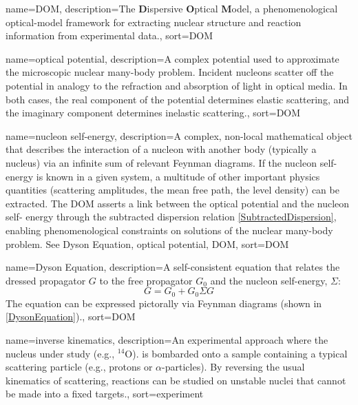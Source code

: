 \makeglossaries

{
    name={DOM},
    description={The \textbf{D}ispersive \textbf{O}ptical \textbf{M}odel, a phenomenological optical-model framework for extracting nuclear structure and reaction information from experimental data.},
    sort={DOM}
}

{
    name={optical potential},
    description={A complex potential used to approximate the microscopic nuclear many-body problem. Incident nucleons scatter off the potential in analogy to the refraction and absorption of light in optical media.  In both cases, the real component of the potential determines elastic scattering, and the imaginary component determines inelastic scattering.},
    sort={DOM}
}

{
    name={nucleon self-energy},
    description={A complex, non-local mathematical object that describes the interaction of a
        nucleon with another body (typically a nucleus) via an infinite sum of relevant Feynman 
        diagrams. If the nucleon self-energy is known in a given system, a multitude of other 
        important physics quantities (scattering amplitudes, the mean free path, the level density) 
        can be extracted. The DOM asserts a link between the optical potential and the nucleon self-
        energy through the subtracted dispersion relation \ref{SubtractedDispersion}, enabling 
        phenomenological constraints on solutions of the nuclear many-body 
        problem. See \Gls{Dyson Equation}, \Gls{optical potential}, \Gls{DOM}},
    sort={DOM}
}

{
    name={Dyson Equation},
    description={A self-consistent equation that relates the dressed propagator $G$ to the free
        propagator $G_{0}$ and the \Gls{nucleon self-energy}, $\Sigma$:
        \begin{equation}
            G = G_{0} + G_{0} \Sigma G
        \end{equation}
        The equation can be expressed pictorally via Feynman diagrams (shown in
        \ref{DysonEquation}).},
    sort={DOM}
}

{
    name={inverse kinematics},
    description={An experimental approach where the nucleus under study
        (e.g., $^{14}$O). is bombarded onto a sample containing a typical
        scattering particle (e.g., protons or $\alpha$-particles).
        By reversing the usual kinematics of scattering,
        reactions can be studied on unstable nuclei that
    cannot be made into a fixed targets.},
    sort={experiment}
}

